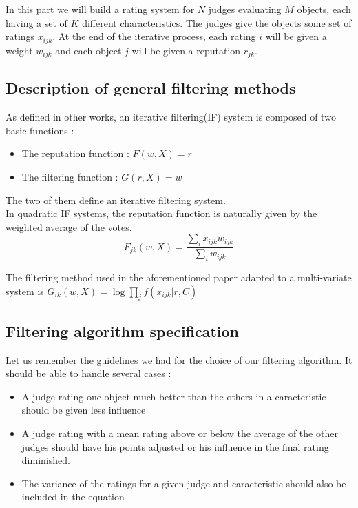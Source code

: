 In this part we will build a rating system for $N$ judges evaluating $M$ objects, each having a set of $K$ different characteristics. 
The judges give the objects some set of ratings $x_{ijk}$.
At the end of the iterative process, each rating $i$ will be given a weight $w_{ijk}$ and each object $j$ will be given a reputation $r_{jk}$.


\subsection*{Description of general filtering methods}
As defined in other works, an iterative filtering(IF) system is composed of two basic functions \cite{Cristo1} : 
\begin{itemize}
\item The reputation function : $F(w,X)=r$
\item The filtering function : $G(r,X)=w$
\end{itemize}
The two of them define an iterative filtering system.\\
In quadratic IF systems, the reputation function is naturally given by the weighted average of the votes.
$$F_{jk}(w,X) = \frac{\sum_{i}x_{ijk}w_{ijk}}{\sum_i w_{ijk}}$$

The filtering method used in the aforementioned paper adapted to a multi-variate system is $G_{ik}(w,X) = \log \prod_j f(x_{ijk}|r,C)$

\subsection*{Filtering algorithm specification}
Let us remember the guidelines we had for the choice of our filtering algorithm. It should be able to handle several cases :
\begin{itemize}
\item A judge rating one object much better than the others in a caracteristic should be given less influence
\item A judge rating with a mean rating above or below the average of the other judges should have his points adjusted or his influence in the final rating diminished.
\item The variance of the ratings for a given judge and caracteristic should also be included in the equation
\end{itemize}

